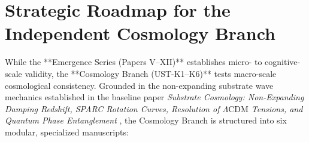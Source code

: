 \documentclass[11pt,a4paper]{article}
\begin{document}
	\section{Strategic Roadmap for the Independent Cosmology Branch}
	\label{sec:cosmology_roadmap}
	
	While the **Emergence Series (Papers V--XII)** establishes micro- to cognitive-scale validity, the **Cosmology Branch (UST-K1--K6)** tests macro-scale cosmological consistency. Grounded in the non-expanding substrate wave mechanics established in the baseline paper \textit{Substrate Cosmology: Non-Expanding Damping Redshift, SPARC Rotation Curves, Resolution of $\Lambda\text{CDM}$ Tensions, and Quantum Phase Entanglement} \cite{USTCosmo}, the Cosmology Branch is structured into six modular, specialized manuscripts:
	
\end{document}
